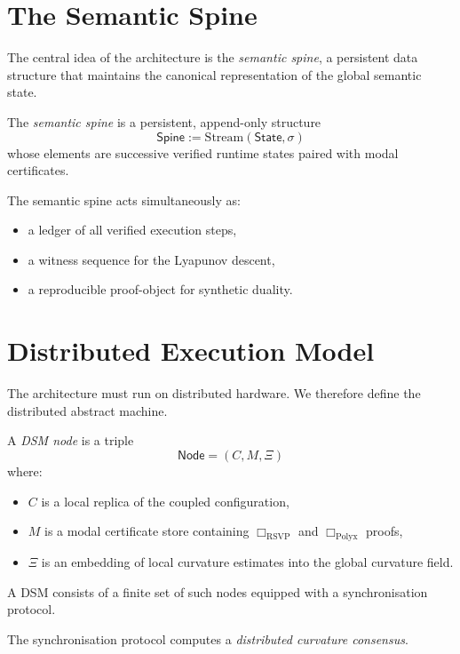 \section{The Semantic Spine}

The central idea of the architecture is the \emph{semantic spine}, a persistent 
data structure that maintains the canonical representation of the global 
semantic state.

\begin{definition}
The \emph{semantic spine} is a persistent, append-only structure
\[
\mathsf{Spine}
  := \mathrm{Stream}(\mathsf{State},\sigma)
\]
whose elements are successive verified runtime states paired with modal 
certificates.
\end{definition}

The semantic spine acts simultaneously as:
\begin{itemize}
\item a ledger of all verified execution steps,
\item a witness sequence for the Lyapunov descent,
\item a reproducible proof-object for synthetic duality.
\end{itemize}

\section{Distributed Execution Model}

The architecture must run on distributed hardware.  
We therefore define the distributed abstract machine.

\begin{definition}
A \emph{DSM node} is a triple
\[
\mathsf{Node} = (C,M,\Xi)
\]
where:
\begin{itemize}
\item $C$ is a local replica of the coupled configuration,
\item $M$ is a modal certificate store containing  
      $\Box_{\mathrm{RSVP}}$ and $\Box_{\mathrm{Polyx}}$ proofs,
\item $\Xi$ is an embedding of local curvature estimates into the global 
      curvature field.
\end{itemize}
A DSM consists of a finite set of such nodes equipped with a synchronisation 
protocol.
\end{definition}

The synchronisation protocol computes a \emph{distributed curvature consensus}.

